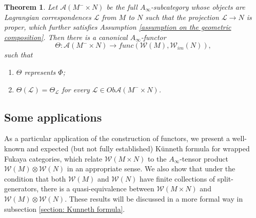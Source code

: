 \documentclass{amsart}
\newtheorem{theorem}{Theorem}[section]
\numberwithin{equation}{section}
\numberwithin{figure}{section}
\begin{document}
\begin{theorem}
\label{functoriality for Lagrangian correspondences}
	Let $\mathcal{A}(M^{-} \times N)$ be the full $A_{\infty}$-subcategory whose objects are Lagrangian correspondences $\mathcal{L}$ from $M$ to $N$ such that the projection $\mathcal{L} \to N$ is proper, which further satisfies Assumption \ref{assumption on the geometric composition}. Then there is a canonical $A_{\infty}$-functor
\begin{equation} \label{A-infinity functor from product to functor category}
\Theta: \mathcal{A}(M^{-} \times N) \to func(\mathcal{W}(M), \mathcal{W}_{im}(N)),
\end{equation}
such that
\begin{enumerate}[label=(\roman*)]

\item $\Theta$ represents $\Phi$;

\item $\Theta(\mathcal{L}) = \Theta_{\mathcal{L}}$ for every $\mathcal{L} \in Ob \mathcal{A}(M^{-} \times N)$.

\end{enumerate}

\end{theorem}

\subsection{Some applications}

	As a particular application of the construction of functors, we present a well-known and expected (but not fully established) K\"{u}nneth formula for wrapped Fukaya categories, which relate $\mathcal{W}(M \times N)$ to the $A_{\infty}$-tensor product $\mathcal{W}(M) \otimes \mathcal{W}(N)$ in an appropriate sense.
We also show that under the condition that both $\mathcal{W}(M)$ and $\mathcal{W}(N)$ have finite collections of split-generators, there is a quasi-equivalence between $\mathcal{W}(M \times N)$ and $\mathcal{W}(M) \otimes \mathcal{W}(N)$. These results will be discussed in a more formal way in subsection \ref{section: Kunneth formula}. \par
\end{document}
